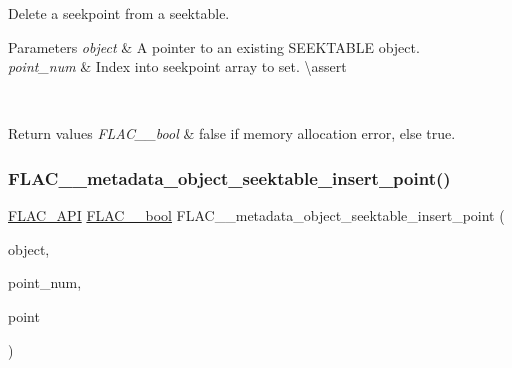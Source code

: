 Delete a seekpoint from a seektable.


\begin{DoxyParams}{Parameters}
{\em object} & A pointer to an existing S\+E\+E\+K\+T\+A\+B\+LE object. \\
\hline
{\em point\+\_\+num} & Index into seekpoint array to set. \textbackslash{}assert 
\begin{DoxyCode}{1}
\end{DoxyCode}
 
\begin{DoxyCode}{1}
\end{DoxyCode}
 
\begin{DoxyCode}{1}
\end{DoxyCode}
 \\
\hline
\end{DoxyParams}

\begin{DoxyRetVals}{Return values}
{\em F\+L\+A\+C\+\_\+\+\_\+bool} & {\ttfamily false} if memory allocation error, else {\ttfamily true}. \\
\hline
\end{DoxyRetVals}
\mbox{\label{group__flac__metadata__object_ga0c658260aaffb126486f5d1e211b53e5}} 
\subsubsection{\texorpdfstring{FLAC\_\_metadata\_object\_seektable\_insert\_point()}{FLAC\_\_metadata\_object\_seektable\_insert\_point()}}
{\footnotesize\ttfamily \mbox{\hyperlink{group__flac__export_ga56ca07df8a23310707732b1c0007d6f5}{F\+L\+A\+C\+\_\+\+A\+PI}} \mbox{\hyperlink{ordinals_8h_a95103469f1cbd78b8cf250194985b34e}{F\+L\+A\+C\+\_\+\+\_\+bool}} F\+L\+A\+C\+\_\+\+\_\+metadata\+\_\+object\+\_\+seektable\+\_\+insert\+\_\+point (\begin{DoxyParamCaption}\item[{\mbox{\hyperlink{struct_f_l_a_c_____stream_metadata}{F\+L\+A\+C\+\_\+\+\_\+\+Stream\+Metadata}} $\ast$}]{object,  }\item[{unsigned}]{point\+\_\+num,  }\item[{\mbox{\hyperlink{struct_f_l_a_c_____stream_metadata___seek_point}{F\+L\+A\+C\+\_\+\+\_\+\+Stream\+Metadata\+\_\+\+Seek\+Point}}}]{point }\end{DoxyParamCaption})}

